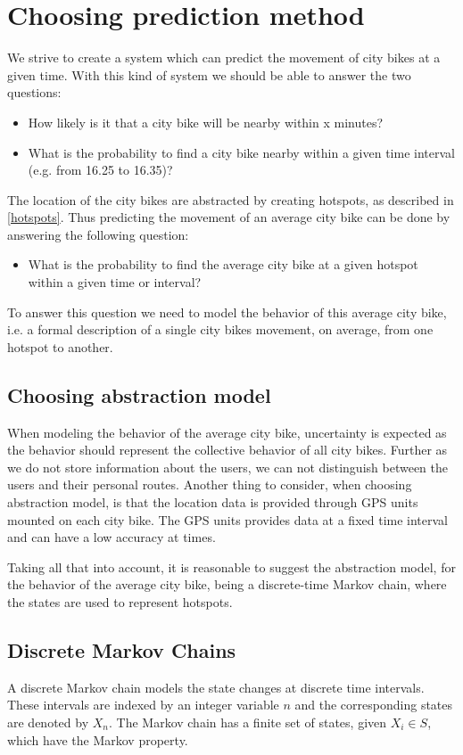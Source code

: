 \section{Choosing prediction method}\label{markov}
We strive to create a system which can predict the movement of city bikes at a given time.
With this kind of system we should be able to answer the two questions:
\begin{itemize}
\item How likely is it that a city bike will be nearby within x minutes?
\item What is the probability to find a city bike nearby within a given time interval (e.g. from 16.25 to 16.35)?
\end{itemize}

The location of the city bikes are abstracted by creating hotspots, as described in \cref{hotspots}.
Thus predicting the movement of an average city bike can be done by answering the following question:

\begin{itemize}
\item What is the probability to find the average city bike at a given hotspot within a given time or interval?
\end{itemize}

To answer this question we need to model the behavior of this average city bike, i.e. a formal description of a single city bikes movement, on average, from one hotspot to another.

\subsection{Choosing abstraction model}
When modeling the behavior of the average city bike, uncertainty is expected as the behavior should represent the collective behavior of all city bikes.
Further as we do not store information about the users, we can not distinguish between the users and their personal routes.
Another thing to consider, when choosing abstraction model, is that the location data is provided through GPS units mounted on each city bike.
The GPS units provides data at a fixed time interval and can have a low accuracy at times.

Taking all that into account, it is reasonable to suggest the abstraction model, for the behavior of the average city bike, being a discrete-time Markov chain, where the states are used to represent hotspots.

\subsection{Discrete Markov Chains}
A discrete Markov chain models the state changes at discrete time intervals.
These intervals are indexed by an integer variable $ n $ and the corresponding states are denoted by $ X_n $.
The Markov chain has a finite set of states, given $X_i \in S$, which have the Markov property.

